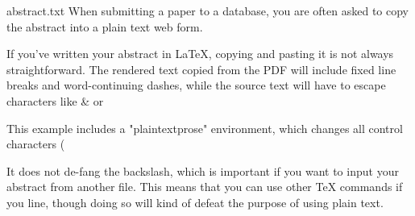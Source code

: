 \begin{filecontents*}{abstract.txt}
When submitting a paper to a database, you are often asked to copy the abstract into a plain text web form.

If you've written your abstract in LaTeX, copying and pasting it is not always straightforward. The rendered text copied from the PDF will include fixed line breaks and word-continuing dashes, while the source text will have to escape characters like & or %

This example includes a "plaintextprose" environment, which changes all control characters (%

It does not de-fang the backslash, which is important if you want to input your abstract from another file. This means that you can use other \TeX{} commands if you line, though doing so will kind of defeat the purpose of using plain text.
\end{filecontents*}

\documentclass{article}
\thispagestyle{empty}   %

\usepackage[strict=true]{csquotes}

%
%
%
\newenvironment{plaintextprose}
{%
    \begingroup%
        \catcode`\$=12%
        \catcode`\&=12%
        \catcode`\#=12%
        \catcode`\^=12%
        \catcode`\_=12%
        \catcode`\~=12%
        \catcode`\%=12}
{\endgroup}



    \begin{abstract}%
        \begin{plaintextprose}\end{plaintextprose}%
    \end{abstract}


